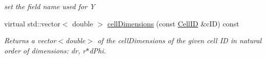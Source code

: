\begin{DoxyCompactItemize}
\begin{DoxyCompactList}\small\item\em set the field name used for Y \item\end{DoxyCompactList}\item 
virtual std::vector$<$ double $>$ \hyperlink{class_d_d4hep_1_1_d_d_segmentation_1_1_polar_grid_r_phi_a4f443aab6b49eb7bb6a831fd9fd908ee}{cellDimensions} (const \hyperlink{namespace_d_d4hep_1_1_d_d_segmentation_ac7af071d85cb48820914434a07e21ba1}{CellID} \&cID) const 
\begin{DoxyCompactList}\small\item\em Returns a vector$<$double$>$ of the cellDimensions of the given cell ID in natural order of dimensions: dr, r$\ast$dPhi. \item\end{DoxyCompactList}\end{DoxyCompactItemize}
